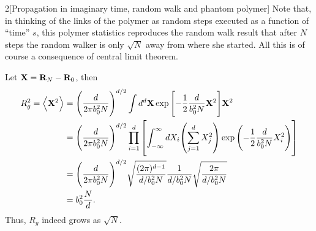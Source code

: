 \documentclass[12pt]{article}
\begin{document}
\begin{problem}{2}[Propagation in imaginary time, random walk and phantom
    polymer]
Note that, in thinking of the links of the polymer as random steps executed as a
function of ``time'' $s$, this polymer statistics reproduces the random walk
result that after $N$ steps the random walker is only $\sqrt{N}$ away from where
she started. All this is of course a consequence of central limit theorem.

\begin{solution}
Let $\vb{X}=\vb{R}_N-\vb{R}_0$, then
\begin{align}
    R_g^2=\expval{\vb{X}^2} 
    &=\qty(\frac{d}{2\pi b_0^2N})^{d/2}
    \int d^d\vb{X} \exp\qty[-\frac12\frac{d}{b_0^2N}\vb{X}^2]\vb{X}^2\notag\\
    &=\qty(\frac{d}{2\pi b_0^2N})^{d/2}
    \prod_{i=1}^d\qty[\int_{-\infty}^\infty dX_i\qty(\sum_{j=1}^dX_j^2)
    \exp\qty(-\frac12\frac{d}{b_0^2N}X_i^2)]\notag\\
    &=\qty(\frac{d}{2\pi b_0^2N})^{d/2}\sqrt{\frac{(2\pi)^{d-1}}{d/b_0^2N}}
    \frac1{d/b_0^2N}\sqrt{\frac{2\pi}{d/b_0^2N}}\notag\\
    &=b_0^2\frac{N}{d}.
\end{align}
Thus, $R_g$ indeed grows as $\sqrt{N}$.
\end{solution}
\end{problem}
\newpage
\end{document}
